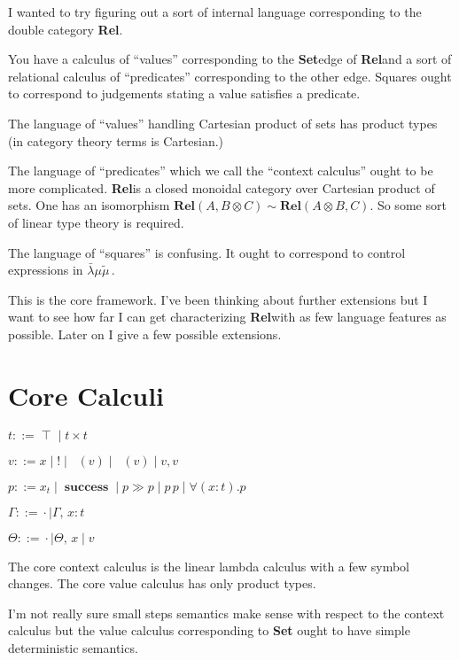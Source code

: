 \documentclass[twocolumn]{scrartcl}
\newcommand{\Rel}{\textbf{Rel}}
\newcommand{\Set}{\textbf{Set}}
\newcommand{\lk}{\(\bar{\lambda}\mu\tilde{\mu}\,\)}
\newcommand{\bnfdef}{\mathrel{::=}}
\DeclareMathOperator{\unit}{\top}
\DeclareMathOperator{\coin}{\textbf{!}}
\DeclareMathOperator{\fst}{\pi_1}
\DeclareMathOperator{\snd}{\pi_2}
\DeclareMathOperator{\success}{\textbf{success}}
\newcommand{\pass}{\mathbin{\gg}}
\begin{document}
I wanted to try figuring out a sort of internal language corresponding
to the double category \Rel.

You have a calculus of ``values'' corresponding to the \Set edge of
\Rel and a sort of relational calculus of ``predicates'' corresponding
to the other edge. Squares ought to correspond to judgements stating a
value satisfies a predicate.

The language of ``values'' handling Cartesian product of sets has
product types (in category theory terms is Cartesian.)

The language of ``predicates'' which we call the ``context calculus''
ought to be more complicated. \Rel is a closed monoidal category over
Cartesian product of sets.  One has an isomorphism \( \Rel(A, B
\otimes C) \sim \Rel (A \otimes B, C) \).  So some sort of linear type
theory is required.

The language of ``squares'' is confusing. It ought to correspond to
control expressions in \lk.

This is the core framework.  I've been thinking about further
extensions but I want to see how far I can get characterizing
\Rel with as few language features as possible.  Later on I
give a few possible extensions.

\section*{Core Calculi}

\begin{description}[nosep]
\item[Types] \hfill \( t \bnfdef \unit \mid t \times t \)
\item[Values] \hfill \( v \bnfdef x \mid \coin \mid \fst(v) \mid \snd(v) \mid v , v \)
\item[Predicates] \hfill \( p \bnfdef x_t \mid \success \mid p \pass p \mid p \, p \mid \forall (x \colon t) . p \)
\item[Environment] \hfill \( \Gamma \bnfdef \cdot \mid \Gamma , \, x \colon t  \)
\item[Control Environment] \hfill \( \Theta \bnfdef \cdot \mid \Theta , \, x \mid v  \)
\end{description}

The core context calculus is the linear lambda calculus with a few
symbol changes.  The core value calculus has only product types.

I'm not really sure small steps semantics make sense with respect to
the context calculus but the value calculus corresponding to \Set
ought to have simple deterministic semantics.
\end{document}
